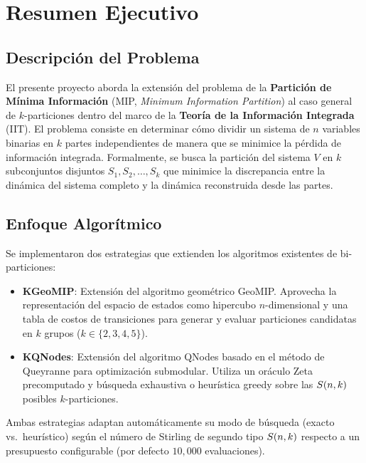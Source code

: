 \section{Resumen Ejecutivo}
\label{sec:resumen}

\subsection{Descripción del Problema}

El presente proyecto aborda la extensión del problema de la \textbf{Partición de Mínima Información} (MIP, \textit{Minimum Information Partition}) al caso general de $k$-particiones dentro del marco de la \textbf{Teoría de la Información Integrada} (IIT). El problema consiste en determinar cómo dividir un sistema de $n$ variables binarias en $k$ partes independientes de manera que se minimice la pérdida de información integrada. Formalmente, se busca la partición del sistema $V$ en $k$ subconjuntos disjuntos $S_1, S_2, \ldots, S_k$ que minimice la discrepancia entre la dinámica del sistema completo y la dinámica reconstruida desde las partes.

\subsection{Enfoque Algorítmico}

Se implementaron dos estrategias que extienden los algoritmos existentes de bi-particiones:

\begin{itemize}[itemsep=4pt]
    \item \textbf{KGeoMIP}: Extensión del algoritmo geométrico GeoMIP. Aprovecha la representación del espacio de estados como hipercubo $n$-dimensional y una tabla de costos de transiciones para generar y evaluar particiones candidatas en $k$ grupos ($k \in \{2,3,4,5\}$).

    \item \textbf{KQNodes}: Extensión del algoritmo QNodes basado en el método de Queyranne para optimización submodular. Utiliza un oráculo Zeta precomputado y búsqueda exhaustiva o heurística greedy sobre las $S(n,k)$ posibles $k$-particiones.
\end{itemize}

Ambas estrategias adaptan automáticamente su modo de búsqueda (exacto vs.\ heurístico) según el número de Stirling de segundo tipo $S(n,k)$ respecto a un presupuesto configurable (por defecto $10{,}000$ evaluaciones).

